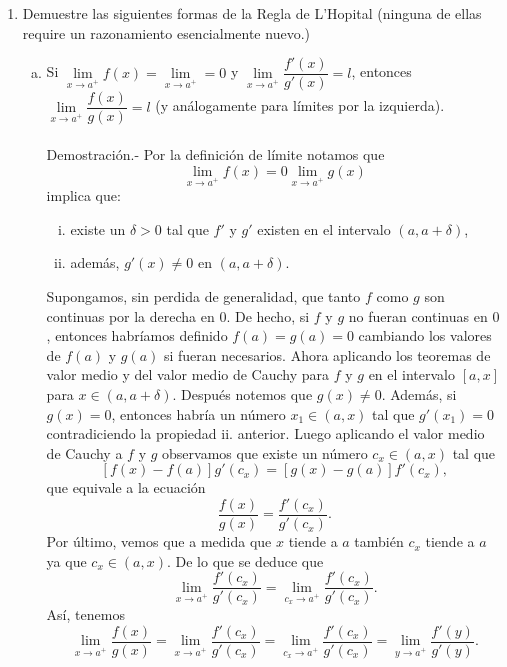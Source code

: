 \begin{enumerate}[\bfseries 1.]
    \item Demuestre las siguientes formas de la Regla de L'Hopital (ninguna de ellas require un razonamiento esencialmente nuevo.)\\
	\begin{enumerate}[(a)]

	    \item Si $\lim\limits_{x\to a^+}f(x)=\lim\limits_{x\to a^+}=0$ y $\lim\limits_{x\to a^+}\dfrac{f'(x)}{g'(x)}=l$, entonces $\lim\limits_{x\to a^+}\dfrac{f(x)}{g(x)}=l$ (y análogamente para límites por la izquierda).\\\\
		Demostración.-\; Por la definición de límite notamos que
		$$\lim_{x\to a^+}f(x)=0\lim_{x\to a^+}g(x)$$
		implica que:
		\begin{enumerate}[i.]
		    \item existe un $\delta>0$ tal que $f'$ y $g'$ existen en el intervalo $(a,a+\delta)$,
		    \item además, $g'(x)\neq 0$ en $(a,a+\delta)$.
		\end{enumerate}
		Supongamos, sin perdida de generalidad, que tanto $f$ como $g$ son continuas por la derecha en $0$. De hecho, si $f$ y $g$ no fueran continuas en $0$, entonces habríamos definido $f(a)=g(a)=0$ cambiando los valores de $f(a)$ y $g(a)$ si fueran necesarios. Ahora aplicando los teoremas de valor medio y del valor medio de Cauchy para $f$ y $g$ en el intervalo $[a,x]$ para $x\in (a,a+\delta)$. Después notemos que $g(x)\neq 0$. Además, si $g(x)=0$, entonces habría un número $x_1\in(a,x)$ tal que $g'(x_1)=0$ contradiciendo la propiedad ii. anterior. Luego aplicando el valor medio de Cauchy a $f$ y $g$ observamos que existe un número $c_x\in (a,x)$ tal que
		$$\left[f(x)-f(a)\right]g'(c_x)=\left[g(x)-g(a)\right]f'(c_x),$$
		que equivale a la ecuación
		$$\dfrac{f(x)}{g(x)}=\dfrac{f'(c_x)}{g'(c_x)}.$$
		Por último, vemos que a medida que $x$ tiende a $a$ también $c_x$ tiende a $a$ ya que $c_x\in (a,x)$. De lo que se deduce que 
		$$\lim_{x\to a^+}\dfrac{f'(c_x)}{g'(c_x)}=\lim_{c_x\to a^+}\dfrac{f'(c_x)}{g'(c_x)}.$$
		Así, tenemos
		$$\lim_{x\to a^+}\dfrac{f(x)}{g(x)}=\lim_{x\to a^+}\dfrac{f'(c_x)}{g'(c_x)}=\lim_{c_x\to a^+}\dfrac{f'(c_x)}{g'(c_x)}=\lim_{y\to a^+}\dfrac{f'(y)}{g'(y)}.$$\\


\end{enumerate}
\end{enumerate}
